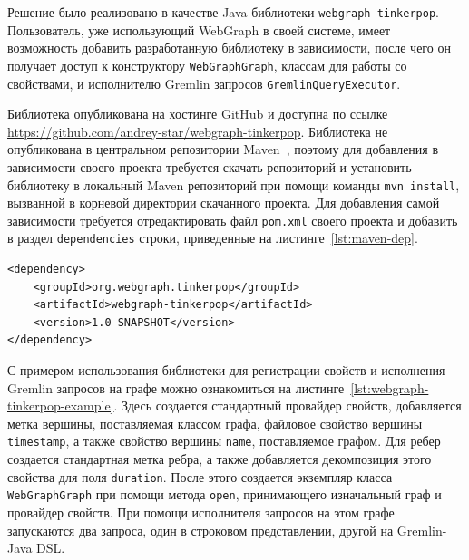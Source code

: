 \documentclass[times,specification,annotation]{itmo-student-thesis}
\begin{document}
Решение было реализовано в качестве Java библиотеки \texttt{webgraph-tinkerpop}. Пользователь, уже использующий WebGraph в своей системе, имеет возможность добавить разработанную библиотеку в зависимости, после чего он получает доступ к конструктору \texttt{WebGraphGraph}, классам для работы со свойствами, и исполнителю Gremlin запросов \texttt{GremlinQueryExecutor}.

Библиотека опубликована на хостинге GitHub и доступна по ссылке \url{https://github.com/andrey-star/webgraph-tinkerpop}. Библиотека не опубликована в центральном репозитории Maven~\cite{maven}, поэтому для добавления в зависимости своего проекта требуется скачать репозиторий и установить библиотеку в локальный Maven репозиторий при помощи команды \texttt{mvn install}, вызванной в корневой директории скачанного проекта. Для добавления самой зависимости требуется отредактировать файл \texttt{pom.xml} своего проекта и добавить в раздел \texttt{dependencies} строки, приведенные на листинге~\ref{lst:maven-dep}.

\begin{lstlisting}[float=!h,caption={Добавление \texttt{webgraph-tinkerpop} в зависимости проекта},label={lst:maven-dep}]
<dependency>
    <groupId>org.webgraph.tinkerpop</groupId>
    <artifactId>webgraph-tinkerpop</artifactId>
    <version>1.0-SNAPSHOT</version>
</dependency>
\end{lstlisting}

С примером использования библиотеки для регистрации свойств и исполнения Gremlin запросов на графе можно ознакомиться на листинге~\ref{lst:webgraph-tinkerpop-example}. Здесь создается стандартный провайдер свойств, добавляется метка вершины, поставляемая классом графа, файловое свойство вершины \texttt{timestamp}, а также свойство вершины \texttt{name}, поставляемое графом. Для ребер создается стандартная метка ребра, а также добавляется декомпозиция этого свойства для поля \texttt{duration}. После этого создается экземпляр класса \texttt{WebGraphGraph} при помощи метода \texttt{open}, принимающего изначальный граф и провайдер свойств. При помощи исполнителя запросов на этом графе запускаются два запроса, один в строковом представлении, другой на Gremlin-Java DSL.
\end{document}
